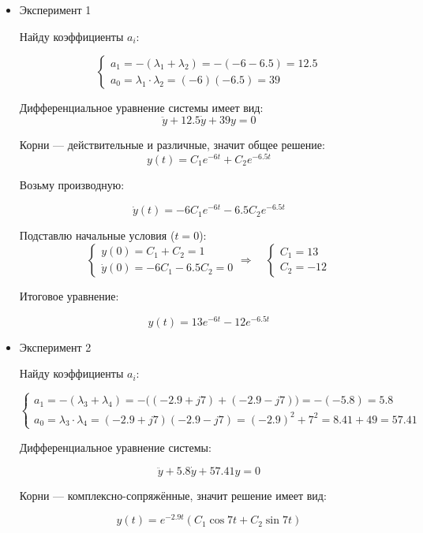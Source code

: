 \documentclass[a4paper,12pt]{article}
\begin{document}
	
	\begin{itemize}
		
		\item Эксперимент 1

		Найду коэффициенты \(a_i\):
		
		\[
		\begin{cases}
			a_1 = -(\lambda_1 + \lambda_2) = -(-6 - 6.5) = 12.5 \\[8pt]
			a_0 = \lambda_1 \cdot \lambda_2 = (-6)(-6.5) = 39
		\end{cases}
		\]
		
		Дифференциальное уравнение системы имеет вид:
		\[
		\ddot{y} + 12.5 \dot{y} + 39 y = 0
		\]
		
		Корни — действительные и различные, значит общее решение:
		\[
		y(t) = C_1 e^{-6t} + C_2 e^{-6.5t}
		\]
		
		Возьму производную:
		
		\[
		\dot{y}(t) = -6 C_1 e^{-6t} - 6.5 C_2 e^{-6.5t}
		\]
		
		Подставлю начальные условия (\( t=0 \)):
		\[
		\begin{cases}
		y(0) = C_1 + C_2 = 1 \\[8pt]
		\dot{y}(0) = -6 C_1 - 6.5 C_2 = 0
		\end{cases} \Rightarrow \quad
		\begin{cases}
			C_1 = 13 \\[8pt]
			C_2 = -12
		\end{cases}		
		\]
		
		Итоговое уравнение:
		
		\[
			y(t) = 13 e^{-6t} - 12 e^{-6.5t}
		\]
		
		\item Эксперимент 2
		
		Найду коэффициенты \(a_i\):
		
		\[
		\begin{cases}
			a_1 = -(\lambda_3 + \lambda_4) = -\big((-2.9 + j7) + (-2.9 - j7)\big) = -(-5.8) = 5.8 \\[8pt]
			a_0 = \lambda_3 \cdot \lambda_4 = (-2.9 + j7)(-2.9 - j7) = (-2.9)^2 + 7^2 = 8.41 + 49 = 57.41
		\end{cases}
		\]
		
		Дифференциальное уравнение системы:
		
		\[
		\ddot{y} + 5.8 \dot{y} + 57.41 y = 0
		\]
		
		Корни — комплексно-сопряжённые, значит решение имеет вид:
		
		\[
		y(t) = e^{-2.9 t} \left( C_1 \cos 7 t + C_2 \sin 7 t \right)
		\]
		

\end{itemize}
\end{document}

